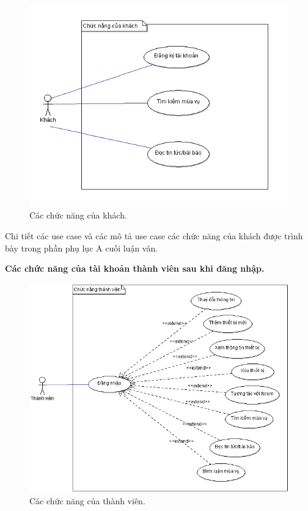 \documentclass[a4paper,12pt,oneside]{article}
\begin{document}
\begin{figure}[H]
\centering
\includegraphics[scale=.9]{hinh/uc_web1.png}
\caption{Các chức năng của khách.}
\end{figure}

\noindent Chi tiết các use case và các mô tả use case các chức năng của khách được trình bày trong phần phụ lục A cuối luận văn.

\newpage
\indent \textbf{Các chức năng của tài khoản thành viên sau khi đăng nhập.}\\

\begin{figure}[H]
	\centering
	\includegraphics[scale=.9]{hinh/cntv.png}
	\caption{Các chức năng của thành viên.}
\end{figure}
\end{document}
